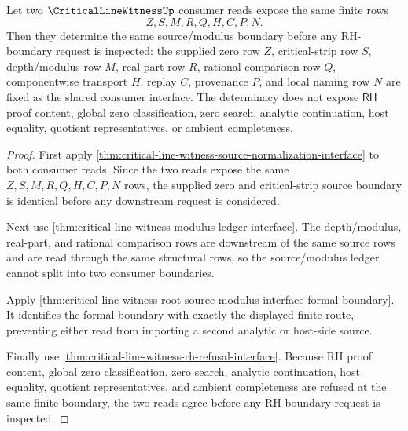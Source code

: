 \begin{theorem}
\label{thm:critical-line-witness-source-modulus-consumer-determinacy}
Let two $\CriticalLineWitnessUp$ consumer reads expose the same finite rows
$$
Z,S,M,R,Q,H,C,P,N.
$$
Then they determine the same source/modulus boundary before any RH-boundary request is inspected: the supplied zero row $Z$, critical-strip row $S$, depth/modulus row $M$, real-part row $R$, rational comparison row $Q$, componentwise transport $H$, replay $C$, provenance $P$, and local naming row $N$ are fixed as the shared consumer interface. The determinacy does not expose $\mathsf{RH}$ proof content, global zero classification, zero search, analytic continuation, host equality, quotient representatives, or ambient completeness.
\end{theorem}
\begin{proof}
First apply \autoref{thm:critical-line-witness-source-normalization-interface} to both consumer reads. Since the two reads expose the same $Z,S,M,R,Q,H,C,P,N$ rows, the supplied zero and critical-strip source boundary is identical before any downstream request is considered.

Next use \autoref{thm:critical-line-witness-modulus-ledger-interface}. The depth/modulus, real-part, and rational comparison rows are downstream of the same source rows and are read through the same structural rows, so the source/modulus ledger cannot split into two consumer boundaries.

Apply \autoref{thm:critical-line-witness-root-source-modulus-interface-formal-boundary}. It identifies the formal boundary with exactly the displayed finite route, preventing either read from importing a second analytic or host-side source.

Finally use \autoref{thm:critical-line-witness-rh-refusal-interface}. Because RH proof content, global zero classification, zero search, analytic continuation, host equality, quotient representatives, and ambient completeness are refused at the same finite boundary, the two reads agree before any RH-boundary request is inspected.
\end{proof}
